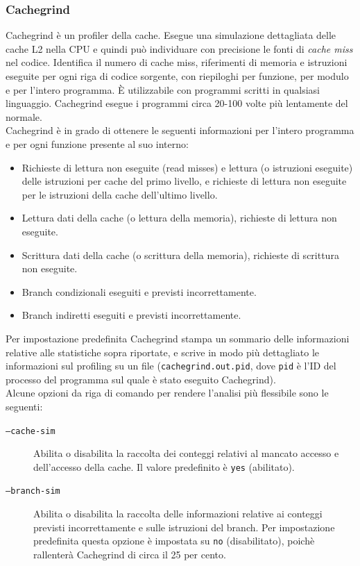 \documentclass{article}
\begin{document}
\subsubsection{Cachegrind}

Cachegrind è un profiler della cache. Esegue una simulazione dettagliata delle
cache L2 nella CPU e quindi può individuare con precisione le fonti di
\emph{cache miss} nel codice. Identifica il numero di cache miss, riferimenti di
memoria e istruzioni eseguite per ogni riga di codice sorgente, con riepiloghi
per funzione, per modulo e per l'intero programma. È utilizzabile con programmi scritti
in qualsiasi linguaggio. Cachegrind esegue i programmi circa 20-100 volte più
lentamente del normale. \\

Cachegrind è in grado di ottenere le seguenti informazioni per l'intero programma e per ogni funzione presente al suo interno:

\begin{itemize}
    \item Richieste di lettura non eseguite (read misses) e lettura (o
    istruzioni eseguite) delle istruzioni per cache del primo livello, e
    richieste di lettura non eseguite per le istruzioni della cache dell'ultimo livello.
    \item Lettura dati della cache (o lettura della memoria), richieste di lettura non eseguite.
    \item Scrittura dati della cache (o scrittura della memoria), richieste di scrittura non eseguite.
    \item Branch condizionali eseguiti e previsti incorrettamente.
    \item Branch indiretti eseguiti e previsti incorrettamente.
\end{itemize}

Per impostazione predefinita Cachegrind stampa un sommario delle informazioni
relative alle statistiche sopra riportate, e scrive in modo più dettagliato le
informazioni sul profiling su un file (\texttt{cachegrind.out.pid}, dove \texttt{pid} è l'ID del
processo del programma sul quale è stato eseguito Cachegrind). \\

Alcune opzioni da riga di comando per rendere l'analisi più flessibile sono le
seguenti:

\begin{description}
    \item[\texttt{--cache-sim}] Abilita o disabilita la raccolta dei conteggi relativi al mancato accesso e dell'accesso della cache. Il valore predefinito è \texttt{yes} (abilitato).
    \item[\texttt{--branch-sim}] Abilita o disabilita la raccolta delle informazioni relative ai conteggi
    previsti incorrettamente e sulle istruzioni del branch. Per impostazione
    predefinita questa opzione è impostata su \texttt{no} (disabilitato), poichè
    rallenterà Cachegrind di circa il 25 per cento. 
\end{description}
\end{document}

